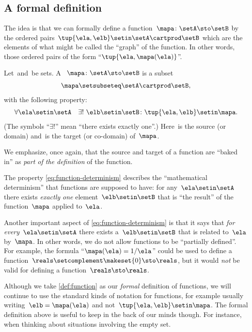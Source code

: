 \subsection{A formal definition}

The idea is that we can formally define a function~$\mapa\colon \setA \sto \setB$ by the ordered pairs~$\tup{\ela, \elb} \setin\setA \cartprod \setB$ which are the elements of what might be called the ``graph'' of the function.
In other words, those ordered pairs of the form ``$\tup{\ela, \mapa(\ela)}$''.

\begin{ctdefinition}[Function]
    \label{def:function}
    Let~\setA and~\setB be sets.
    A ~$\mapa\colon \setA \sto \setB$ is a subset
    \begin{equation}
        \mapa \setsubseteq \setA \cartprod \setB,
    \end{equation}
    with the following property:
    \begin{equation}
        \label{eq:function-determinism}
        \forall \ela \setin\setA \quad \exists !
        \ \elb \setin\setB \colon \tup{\ela,\elb} \setin\mapa.
    \end{equation}
    (The symbols ``$\exists !$'' mean ``there exists exactly one''.)
    Here~\setA is the source (or domain) and~\setB is the target (or co-domain) of~$\mapa$.
\end{ctdefinition}

We emphasize, once again, that the source and target of a function are ``baked in'' as \emph{part of the definition} of the function.

The property \cref{eq:function-determinism} describes the ``mathematical determinism'' that functions are supposed to have: for any~$\ela \setin\setA$ there exists \emph{exactly one} element~$\elb \setin\setB$ that is ``the result'' of the function~$\mapa$ applied to~$\ela$.

Another important aspect of \cref{eq:function-determinism} is that it says that \emph{for every}~$\ela \setin\setA$ there exists a~$\elb \setin\setB$ that is related to~$\ela$ by~$\mapa$.
In other words, we do not allow functions to be ``partially defined''.
For example, the formula ``$\mapa(\ela) = 1/ \ela$'' could be used to define a function~$\reals \setcomplement \makeset{ 0 } \sto \reals$, but it would \emph{not} be valid for defining a function~$\reals \sto \reals$.

Although we take \cref{def:function} as our \emph{formal} definition of functions, we will continue to use the standard kinds of notation for functions, for example usually writing~$\elb = \mapa(\ela)$ and not~$\tup{\ela, \elb} \setin\mapa$.
The formal definition above is useful to keep in the back of our minds though.
For instance, when thinking about situations involving the empty set.

